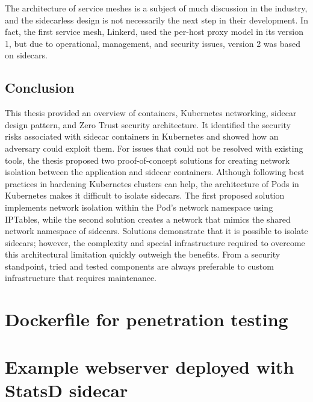 \documentclass[english, 12pt, a4paper, sci, utf8, a-2b, online]{aaltothesis}
\begin{document}
The architecture of service meshes is a subject of much discussion in the industry, and the sidecarless design is not necessarily the next step in their development.
In fact, the first service mesh, Linkerd, used the per-host proxy model in its version 1, but due to operational, management, and security issues, version 2 was based on sidecars.

\subsection{Conclusion}

This thesis provided an overview of containers, Kubernetes networking, sidecar design pattern, and Zero Trust security architecture.
It identified the security risks associated with sidecar containers in Kubernetes and showed how an adversary could exploit them.
For issues that could not be resolved with existing tools, the thesis proposed two proof-of-concept solutions for creating network isolation between the application and sidecar containers.
Although following best practices in hardening Kubernetes clusters can help, the architecture of Pods in Kubernetes makes it difficult to isolate sidecars.
The first proposed solution implements network isolation within the Pod's network namespace using IPTables, while the second solution creates a network that mimics the shared network namespace of sidecars.
Solutions demonstrate that it is possible to isolate sidecars; however, the complexity and special infrastructure required to overcome this architectural limitation quickly outweigh the benefits.
From a security standpoint, tried and tested components are always preferable to custom infrastructure that requires maintenance.

\clearpage

\thesisbibliography
\printbibliography

\clearpage


\thesisappendix

\section{Dockerfile for penetration testing} \label{app:malicious-sidecar}



\clearpage

\section{Example webserver deployed with StatsD sidecar} \label{app:node-webapp}
\end{document}
